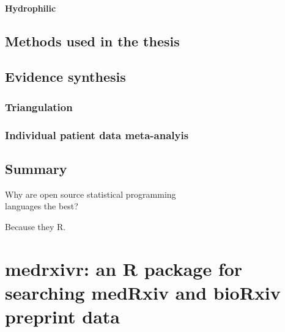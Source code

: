 \documentclass[a4paper, twoside]{templates/ociamthesis}
\begin{document}
\hypertarget{hydrophilic}{%
\subsubsection{Hydrophilic}\label{hydrophilic}}

\hypertarget{methods-used-in-the-thesis}{%
\section{Methods used in the thesis}\label{methods-used-in-the-thesis}}

\hypertarget{evidence-synthesis}{%
\section{Evidence synthesis}\label{evidence-synthesis}}

\hypertarget{triangulation}{%
\subsection{Triangulation}\label{triangulation}}

\hypertarget{individual-patient-data-meta-analyis}{%
\subsection{Individual patient data meta-analyis}\label{individual-patient-data-meta-analyis}}

\hypertarget{summary-1}{%
\section{Summary}\label{summary-1}}

\begin{savequote}
Why are open source statistical programming\\
languages the best?

Because they R.
\end{savequote}



\hypertarget{sys-rev-tools-heading}{%
\chapter{medrxivr: an R package for searching medRxiv and bioRxiv preprint data}\label{sys-rev-tools-heading}}

\minitoc 
\end{document}
